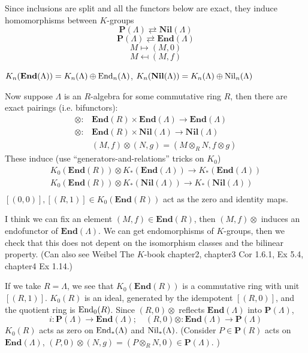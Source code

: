 Since inclusions are split and all the functors below are exact, they induce homomorphisms between $K$-groups
\[\mathbf{P}(\Lambda)  \rightleftarrows \mathbf{Nil}(\Lambda)\]
\[\mathbf{P}(\Lambda)  \rightleftarrows \mathbf{End}(\Lambda)\]
\[M \mapsto (M,0)\]
\[M \mapsfrom (M,f)\]
\begin{definition}
	$K_n(\mathbf{End}(\Lambda))=K_n(\Lambda) \oplus \mathrm{End}_n(\Lambda)$, $K_n(\mathbf{Nil}(\Lambda))=K_n(\Lambda) \oplus \mathrm{Nil}_n(\Lambda)$
\end{definition}
Now suppose $\Lambda$ is an $R$-algebra for some commutative ring $R$, then there are exact pairings (i.e. bifunctors):
\begin{align*}
	\otimes\colon &\mathbf{End}(R) \times \mathbf{End}(\Lambda) \longrightarrow \mathbf{End}(\Lambda) \\
	\otimes\colon &\mathbf{End}(R) \times \mathbf{Nil}(\Lambda) \longrightarrow \mathbf{Nil}(\Lambda) \\
 				  & (M,f) \otimes (N,g)=(M\otimes_R N, f\otimes g)
\end{align*}
These induce (use ``generators-and-relations'' tricks on $K_0$)
\begin{align*}
	K_0(\mathbf{End}(R)) \otimes K_*(\mathbf{End}(\Lambda)) \longrightarrow K_*(\mathbf{End}(\Lambda)) \\
	K_0(\mathbf{End}(R)) \otimes K_*(\mathbf{Nil}(\Lambda)) \longrightarrow K_*(\mathbf{Nil}(\Lambda)) \\
\end{align*}
$[(0,0)], [(R,1)]\in K_0(\mathbf{End}(R))$ act as the zero and identity maps.

I think we can fix an element $(M,f)\in \mathbf{End}(R)$, then $(M,f)\otimes$ induces an endofunctor of $\mathbf{End}(\Lambda)$. We can get endomorphisms of $K$-groups, then we check that this does not depent on the isomorphism classes and the bilinear property. (Can also see Weibel The $K$-book chapter2, chapter3 Cor 1.6.1, Ex 5.4, chapter4 Ex 1.14.)

If we take $R = \Lambda$, we see that $K_0(\mathbf{End}(R))$ is a commutative ring with unit $[(R,1)]$. $K_0(R)$ is an
ideal, generated by the idempotent $[(R,0)]$, and the quotient
ring is $\mathrm{End}_0(R)$.  Since $(R,0)\otimes$ reflects $\mathbf{End} (\Lambda)$ into $\mathbf{P} (\Lambda)$,
\[i\colon \mathbf{P} (\Lambda) \longrightarrow \mathbf{End} (\Lambda);\quad
 (R,0)\otimes\colon \mathbf{End} (\Lambda) \longrightarrow \mathbf{P} (\Lambda)\]
$K_0(R)$ acts as zero on $\mathrm{End}_*(\Lambda)$ and $\mathrm{Nil}_*(\Lambda)$. (Consider $P\in \mathbf{P}(R)$ acts on $\mathbf{End}(\Lambda)$, $(P,0)\otimes (N,g)=(P\otimes_R N,0) \in \mathbf{P}(\Lambda)$. )


